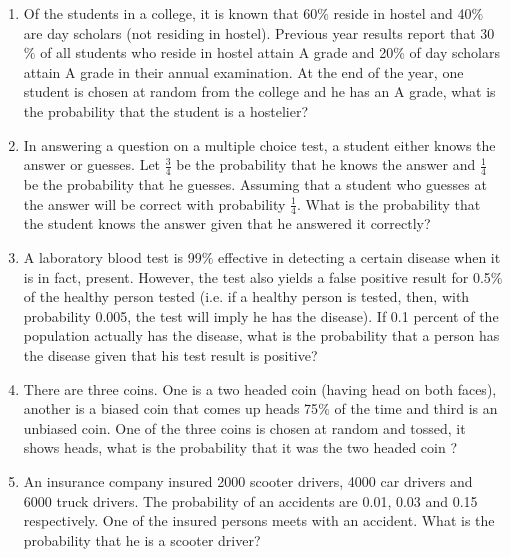 \begin{enumerate}[label=\arabic*.,ref=\thesubsection.\theenumi]
\item Of the students in a college, it is known that 60$\%$ reside in hostel and 40$\%$ are day scholars (not residing in hostel). Previous year results report that 30$\%$ of all students who reside in hostel attain A grade and 20$\%$ of day scholars attain A grade in their annual examination. At the end of the year, one student is chosen at random from the college and he has an A grade, what is the probability that the student is a hostelier?\\
\solution


\item In answering a question on a multiple choice test, a student either knows the
answer or guesses. Let $\frac{3}{4}$ be the probability that he knows the answer and $\frac{1}{4}$ be the probability that he guesses. Assuming that a student who guesses at the answer will be correct with probability $\frac{1}{4}$. What is the probability that the student knows the answer given that he answered it correctly?\\
\solution


\item A laboratory blood test is 99$\%$ effective in detecting a certain disease when it is in fact, present. However, the test also yields a false positive result for 0.5$\%$ of the healthy person tested (i.e. if a healthy person is tested, then, with probability 0.005, the test will imply he has the disease). If 0.1 percent of the population actually has the disease, what is the probability that a person has the disease given that his test result is positive?\\

\item There are three coins. One is a two headed coin (having head on both faces), another is a biased coin that comes up heads 75$\%$ of the time and third is an unbiased coin. One of the three coins is chosen at random and tossed, it shows heads, what is the probability that it was the two headed coin ?\\

\item An insurance company insured 2000 scooter drivers, 4000 car drivers and 6000 truck drivers. The probability of an accidents are 0.01, 0.03 and 0.15 respectively. One of the insured persons meets with an accident. What is the probability that he is a scooter driver?\\


\end{enumerate}
